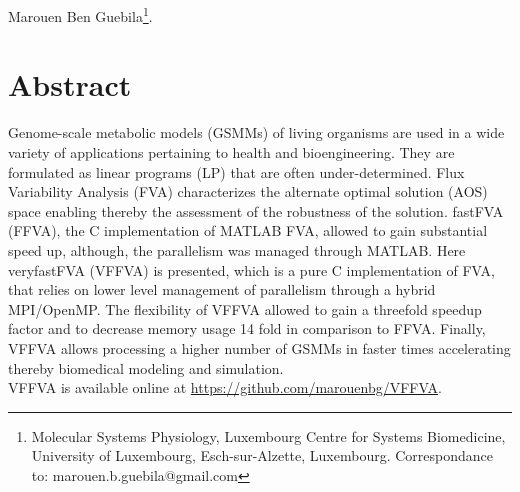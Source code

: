 Marouen Ben Guebila\footnote{Molecular Systems Physiology, Luxembourg Centre for Systems Biomedicine, University of Luxembourg, Esch-sur-Alzette, Luxembourg. Correspondance to: marouen.b.guebila@gmail.com}.\\
\section*{Abstract}
{  
Genome-scale metabolic models (GSMMs) of living organisms are used in a wide variety of applications pertaining to health and bioengineering. They are formulated as linear programs (LP) that are often under-determined. Flux Variability Analysis (FVA) characterizes the alternate optimal solution (AOS) space enabling thereby the assessment of the robustness of the solution. fastFVA (FFVA), the C implementation of MATLAB FVA, allowed to gain substantial speed up, although, the parallelism was managed through MATLAB. Here veryfastFVA (VFFVA) is presented, which is a pure C implementation of FVA, that relies on lower level management of parallelism through a hybrid MPI/OpenMP. The flexibility of VFFVA allowed to gain a threefold speedup factor and to decrease memory usage 14 fold in comparison to FFVA. Finally, VFFVA allows processing a higher number of GSMMs in faster times accelerating thereby biomedical modeling and simulation.\\
VFFVA is available online at \href{https://github.com/marouenbg/VFFVA}{{\color{blue} https://github.com/marouenbg/VFFVA}}.
\par}%


